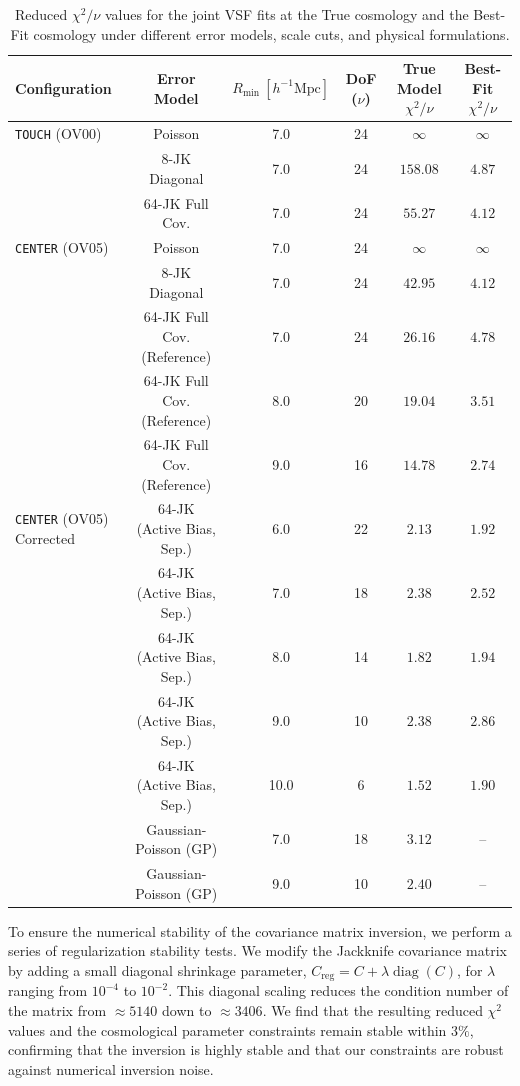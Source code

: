 \documentclass[12pt]{report}
\begin{document}
\begin{table}[H]
    \centering
    \caption{Reduced $\chi^2/\nu$ values for the joint VSF fits at the True cosmology and the Best-Fit cosmology under different error models, scale cuts, and physical formulations.}
    \label{tab:chi2_summary}
    \setlength{\tabcolsep}{8pt}
    \begin{tabular}{lccccc}
        \toprule
        \textbf{Configuration} & \textbf{Error Model} & \textbf{$R_{\mathrm{min}}\ [h^{-1}\mathrm{Mpc}]$} & \textbf{DoF ($\nu$)} & \textbf{True Model $\chi^2/\nu$} & \textbf{Best-Fit $\chi^2/\nu$} \\
        \midrule
        \texttt{TOUCH} (OV00) 
        & Poisson & 7.0 & 24 & $\infty$ & $\infty$ \\
        & 8-JK Diagonal & 7.0 & 24 & $158.08$ & $4.87$ \\
        & 64-JK Full Cov. & 7.0 & 24 & $55.27$ & $4.12$ \\
        \midrule
        \texttt{CENTER} (OV05) 
        & Poisson & 7.0 & 24 & $\infty$ & $\infty$ \\
        & 8-JK Diagonal & 7.0 & 24 & $42.95$ & $4.12$ \\
        & 64-JK Full Cov. (Reference) & 7.0 & 24 & $26.16$ & $4.78$ \\
        & 64-JK Full Cov. (Reference) & 8.0 & 20 & $19.04$ & $3.51$ \\
        & 64-JK Full Cov. (Reference) & 9.0 & 16 & $14.78$ & $2.74$ \\
        \midrule
        \texttt{CENTER} (OV05) Corrected
        & 64-JK (Active Bias, Sep.) & 6.0 & 22 & $2.13$ & $1.92$ \\
        & 64-JK (Active Bias, Sep.) & 7.0 & 18 & $2.38$ & $2.52$ \\
        & 64-JK (Active Bias, Sep.) & 8.0 & 14 & $1.82$ & $1.94$ \\
        & 64-JK (Active Bias, Sep.) & 9.0 & 10 & $2.38$ & $2.86$ \\
        & 64-JK (Active Bias, Sep.) & 10.0 & 6 & $1.52$ & $1.90$ \\
        & Gaussian-Poisson (GP) & 7.0 & 18 & $3.12$ & -- \\
        & Gaussian-Poisson (GP) & 9.0 & 10 & $2.40$ & -- \\
        \bottomrule
    \end{tabular}
\end{table}

To ensure the numerical stability of the covariance matrix inversion, we perform a series of regularization stability tests. We modify the Jackknife covariance matrix by adding a small diagonal shrinkage parameter, $C_{\mathrm{reg}} = C + \lambda \operatorname{diag}(C)$, for $\lambda$ ranging from $10^{-4}$ to $10^{-2}$. This diagonal scaling reduces the condition number of the matrix from $\approx 5140$ down to $\approx 3406$. We find that the resulting reduced $\chi^2$ values and the cosmological parameter constraints remain stable within $3\%$, confirming that the inversion is highly stable and that our constraints are robust against numerical inversion noise.
\end{document}
